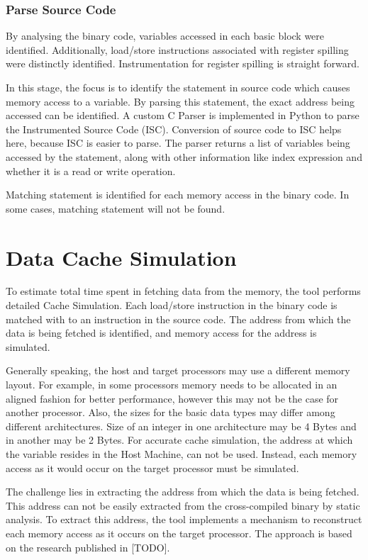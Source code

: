\subsubsection{Parse Source Code}
By analysing the binary code, variables accessed in each basic block were identified. Additionally, load/store instructions associated with register spilling were distinctly identified. Instrumentation for register spilling is straight forward.

In this stage, the focus is to identify the statement in source code which causes memory access to a variable. By parsing this statement, the exact address being accessed can be identified. A custom C Parser is implemented in Python to parse the Instrumented Source Code (ISC). Conversion of source code to ISC helps here, because ISC is easier to parse. The parser returns a list of variables being accessed by the statement, along with other information like index expression and whether it is a read or write operation.

Matching statement is identified for each memory access in the binary code. In some cases, matching statement will not be found.

\section{Data Cache Simulation}
To estimate total time spent in fetching data from the memory, the tool performs detailed Cache Simulation. Each load/store instruction in the binary code is matched with to an instruction in the source code. The address from which the data is being fetched is identified, and memory access for the address is simulated. 

Generally speaking, the host and target processors may use a different memory layout. For example, in some processors memory needs to be allocated in an aligned fashion for better performance, however this may not be the case for another processor. Also, the sizes for the basic data types may differ among different architectures. Size of an integer in one architecture may be 4 Bytes and in another may be 2 Bytes. For accurate cache simulation, the address at which the variable resides in the Host Machine, can not be used. Instead, each memory access as it would occur on the target processor must be simulated.

The challenge lies in extracting the address from which the data is being fetched. This address can not be easily extracted from the cross-compiled binary by static analysis. To extract this address, the tool implements a mechanism to reconstruct each memory access as it occurs on the target processor. The approach is based on the research published in [TODO].

